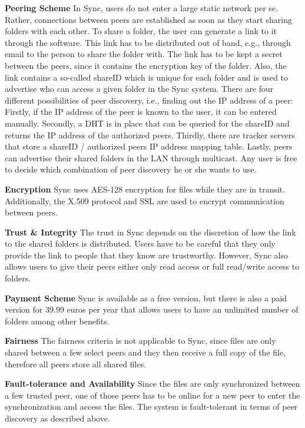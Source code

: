 \textbf{Peering Scheme}
In Sync, users do not enter a large static network per se. Rather, connections between peers are established as soon as they start sharing folders with each other. To share a folder, the user can generate a link to it through the software. This link has to be distributed out of band, e.g., through email to the person to share the folder with. The link has to be kept a secret between the peers, since it contains the encryption key of the folder. Also, the link contains a so-called shareID which is unique for each folder and is used to advertise who can access a given folder in the Sync system. There are four different possibilities of peer discovery, i.e., finding out the IP address of a peer: Firstly, if the IP address of the peer is known to the user, it can be entered manually. Secondly, a DHT is in place that can be queried for the shareID and returns the IP address of the authorized peers. Thirdly, there are tracker servers that store a shareID / authorized peers IP address mapping table. Lastly, peers can advertise their shared folders in the LAN through multicast. Any user is free to decide which combination of peer discovery he or she wants to use.

\textbf{Encryption}
Sync uses AES-128 encryption for files while they are in transit. Additionally, the X.509 protocol and SSL are used to encrypt communication between peers.

\textbf{Trust \& Integrity}
The trust in Sync depends on the discretion of how the link to the shared folders is distributed. Users have to be careful that they only provide the link to people that they know are trustworthy. However, Sync also allows users to give their peers either only read access or full read/write access to folders.

\textbf{Payment Scheme}
Sync is available as a free version, but there is also a paid version for 39.99 euros per year that allows users to have an unlimited number of folders among other benefits.

\textbf{Fairness}
The fairness criteria is not applicable to Sync, since files are only shared between a few select peers and they then receive a full copy of the file, therefore all peers store all shared files.

\textbf{Fault-tolerance and Availability}
Since the files are only synchronized between a few trusted peer, one of those peers has to be online for a new peer to enter the synchronization and access the files. The system is fault-tolerant in terms of peer discovery as described above.

